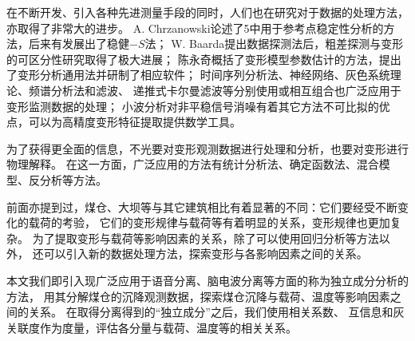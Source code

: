 在不断开发、引入各种先进测量手段的同时，人们也在研究对于数据的处理方法，亦取得了非常大的进步。
A. Chrzanowski论述了5中用于参考点稳定性分析的方法，后来有发展出了稳健$-S$法；
W. Baarda提出数据探测法后，粗差探测与变形的可区分性研究取得了极大进展；
陈永奇概括了变形模型参数估计的方法，提出了变形分析通用法并研制了相应软件；
时间序列分析法、神经网络、灰色系统理论、频谱分析法和滤波、
递推式卡尔曼滤波等分别使用或相互组合也广泛应用于变形监测数据的处理；
小波分析对非平稳信号消噪有着其它方法不可比拟的优点，可以为高精度变形特征提取提供数学工具。

为了获得更全面的信息，不光要对变形观测数据进行处理和分析，也要对变形进行物理解释。
在这一方面，广泛应用的方法有统计分析法、确定函数法、混合模型、反分析等方法。

前面亦提到过，煤仓、大坝等与其它建筑相比有着显著的不同：它们要经受不断变化的载荷的考验，
它们的变形规律与载荷等有着明显的关系，变形规律也更加复杂。
为了提取变形与载荷等影响因素的关系，除了可以使用回归分析等方法以外，
还可以引入新的数据处理方法，探索变形与各影响因素之间的关系。

本文我们即引入现广泛应用于语音分离、脑电波分离等方面的称为独立成分分析的方法，
用其分解煤仓的沉降观测数据，探索煤仓沉降与载荷、温度等影响因素之间的关系。
在取得分离得到的“独立成分”之后，我们使用相关系数、
互信息和灰关联度作为度量，评估各分量与载荷、温度等的相关关系。
